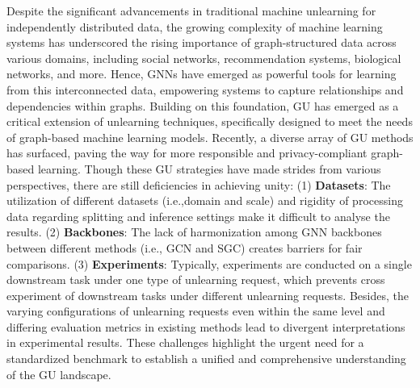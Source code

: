 Despite the significant advancements in traditional machine unlearning for independently distributed data, the growing complexity of machine learning systems has underscored the rising importance of graph-structured data across various domains, including social networks\cite{app10041327,ijcai2018p142}, recommendation systems\cite{su2024dcl,LightGCN, cai2023app_gnn_rec3}, biological networks\cite{NIPS2017_f5077839,10.1093/bioinformatics/bty294,10149537}, and more. Hence, GNNs\cite{2016Convolutional_ChebNet,velivckovic2017gat,hamilton2017graphsage} have emerged as powerful tools for learning from this interconnected data, empowering systems to capture relationships and dependencies within graphs.
Building on this foundation, GU has emerged as a critical extension of unlearning techniques, specifically designed to meet the needs of graph-based machine learning models. Recently, a diverse array of GU methods has surfaced, paving the way for more responsible and privacy-compliant graph-based learning. Though these GU strategies have made strides from various perspectives, there are still deficiencies in achieving unity: (1) \textbf{Datasets}: The utilization of different datasets (i.e.,domain and scale) and rigidity of processing data regarding splitting and inference settings make it difficult to analyse the results. 
(2) \textbf{Backbones}: The lack of harmonization among GNN backbones between different methods (i.e., GCN\cite{kipf2016gcn} and SGC\cite{wu2019sgc}) creates barriers for fair comparisons. (3) \textbf{Experiments}: Typically, experiments are conducted on a single downstream task under one type of unlearning request, which prevents cross experiment of downstream tasks under different unlearning requests. Besides, the varying configurations of unlearning requests even within the same level and differing evaluation metrics in existing methods lead to divergent interpretations in experimental results. These challenges highlight the urgent need for a standardized benchmark to establish a unified and comprehensive understanding of the GU landscape.

